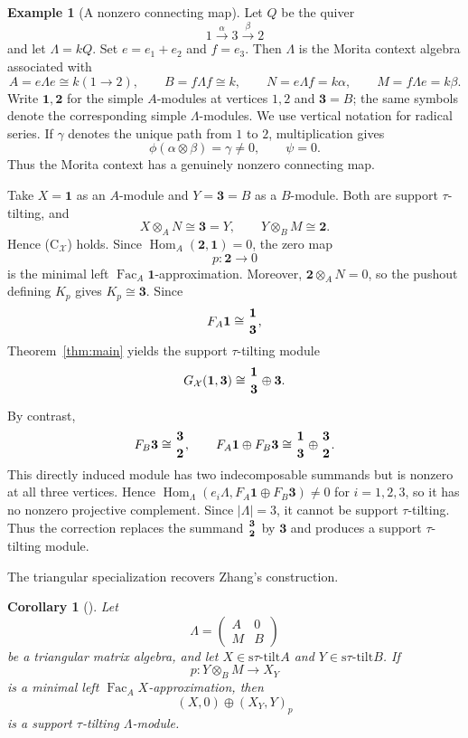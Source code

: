 \documentclass[11pt,reqno]{amsart}
\newtheorem{corollary}[theorem]{Corollary}
\theoremstyle{definition}
\newtheorem{example}[theorem]{Example}
\theoremstyle{remark}
\newcommand{\Fac}{\operatorname{Fac}}
\newcommand{\Hom}{\operatorname{Hom}}
\newcommand{\stau}{\mathrm{s}\tau\text{-}\mathrm{tilt}}
\numberwithin{equation}{section}
\begin{document}
\begin{example}[A nonzero connecting map]\label{ex:nonzero}
Let $Q$ be the quiver
\[
 1\xrightarrow{\alpha}3\xrightarrow{\beta}2
\]
and let $\Lambda=kQ$.  Set $e=e_1+e_2$ and $f=e_3$.  Then $\Lambda$ is
the Morita context algebra associated with
\[
 A=e\Lambda e\cong k(1\longrightarrow2),\qquad B=f\Lambda f\cong k,
 \qquad N=e\Lambda f=k\alpha,\qquad M=f\Lambda e=k\beta.
\]
Write $\mathbf 1,\mathbf 2$ for the simple $A$-modules at vertices $1,2$
and $\mathbf 3=B$; the same symbols denote the corresponding simple
$\Lambda$-modules.  We use vertical notation for radical series.
If $\gamma$ denotes the unique path from $1$ to $2$, multiplication gives
\[
 \phi(\alpha\otimes\beta)=\gamma\ne0,
 \qquad \psi=0.
\]
Thus the Morita context has a genuinely nonzero connecting map.

Take $X=\mathbf 1$ as an $A$-module and $Y=\mathbf 3=B$ as a
$B$-module.  Both are support $\tau$-tilting, and
\[
 X\otimes_AN\cong\mathbf 3=Y,
 \qquad
 Y\otimes_BM\cong\mathbf 2.
\]
Hence \textup{(C$_{\mathcal X}$)} holds.  Since
$\Hom_A(\mathbf 2,\mathbf 1)=0$, the zero map
\[
 p:\mathbf 2\longrightarrow0
\]
is the minimal left $\Fac_A\mathbf 1$-approximation.  Moreover,
$\mathbf 2\otimes_AN=0$, so the pushout defining $K_p$ gives
$K_p\cong\mathbf 3$.  Since
\[
 F_A\mathbf 1\cong
 \genfrac{}{}{0pt}{}{\mathbf 1}{\mathbf 3},
\]
Theorem~\ref{thm:main} yields the support $\tau$-tilting module
\[
 G_{\mathcal X}(\mathbf 1,\mathbf 3)
 \cong
 \genfrac{}{}{0pt}{}{\mathbf 1}{\mathbf 3}
 \oplus\mathbf 3.
\]

By contrast,
\[
 F_B\mathbf 3\cong
 \genfrac{}{}{0pt}{}{\mathbf 3}{\mathbf 2},
 \qquad
 F_A\mathbf 1\oplus F_B\mathbf 3
 \cong
 \genfrac{}{}{0pt}{}{\mathbf 1}{\mathbf 3}
 \oplus
 \genfrac{}{}{0pt}{}{\mathbf 3}{\mathbf 2}.
\]
This directly induced module has two indecomposable summands but is nonzero
at all three vertices.  Hence
$\Hom_\Lambda(e_i\Lambda,F_A\mathbf 1\oplus F_B\mathbf 3)\ne0$ for
$i=1,2,3$, so it has no nonzero projective complement.  Since
$|\Lambda|=3$, it cannot be support $\tau$-tilting.  Thus the correction
replaces the summand
$\genfrac{}{}{0pt}{}{\mathbf 3}{\mathbf 2}$ by $\mathbf 3$ and produces
a support $\tau$-tilting module.
\end{example}

The triangular specialization recovers Zhang's construction.

\begin{corollary}[{\cite[Theorem~5.1]{Zhang}}]\label{cor:Zhang}
Let
\[
 \Lambda=\begin{pmatrix}A&0\\M&B\end{pmatrix}
\]
be a triangular matrix algebra, and let $X\in\stau A$ and
$Y\in\stau B$.  If
\[
 p:Y\otimes_BM\longrightarrow X_Y
\]
is a minimal left $\Fac_AX$-approximation, then
\[
 (X,0)\oplus(X_Y,Y)_p
\]
is a support $\tau$-tilting $\Lambda$-module.
\end{corollary}
\end{document}
